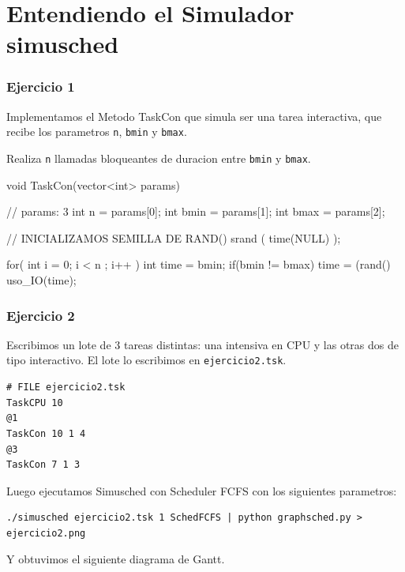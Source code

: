 


\part{Entendiendo el Simulador simusched}

\section{Ejercicio 1}

Implementamos el Metodo TaskCon que simula ser una tarea interactiva, que recibe los parametros \verb|n|, \verb|bmin| y \verb|bmax|.

Realiza \verb|n| llamadas bloqueantes de duracion entre \verb|bmin| y \verb|bmax|.

\begin{framed}
\begin{verbatimtab}
void TaskCon(vector<int> params) { // params: 3
	int n = params[0];
	int bmin = params[1];
	int bmax = params[2];
	
	// INICIALIZAMOS SEMILLA DE RAND()
	srand ( time(NULL) );
	
	for( int i = 0; i < n ; i++ ) {
		int time = bmin;
		if(bmin != bmax)
			time = (rand()%
		uso_IO(time);
	}
}
\end{verbatimtab}
\end{framed}

\section{Ejercicio 2}

Escribimos un lote de 3 tareas distintas: una intensiva en CPU y las otras dos de tipo interactivo. 
El lote lo escribimos en \verb|ejercicio2.tsk|.

\begin{framed}
\begin{verbatim}
# FILE ejercicio2.tsk
TaskCPU 10
@1
TaskCon 10 1 4
@3
TaskCon 7 1 3
\end{verbatim}
\end{framed}

Luego ejecutamos Simusched con Scheduler FCFS con los siguientes parametros:

\begin{verbatim}
./simusched ejercicio2.tsk 1 SchedFCFS | python graphsched.py > ejercicio2.png
\end{verbatim}

Y obtuvimos el siguiente diagrama de Gantt.

